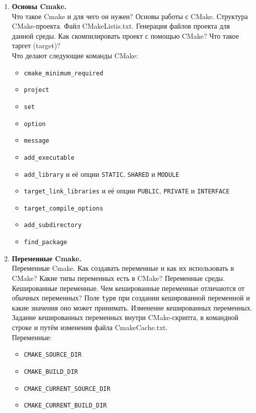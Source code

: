 \documentclass{article}
\begin{document}
\begin{enumerate}
\newpage

\item \textbf{Основы Cmake.}\\
Что такое Cmake и для чего он нужен? Основы работы с CMake. Структура CMake-проекта. Файл CMakeListis.txt. Генерация файлов проекта для данной среды. 
Как скомпилировать проект с помощью CMake? Что такое таргет (target)?\\
Что делают следующие команды CMake:
\begin{itemize}
\item \texttt{cmake\_minimum\_required}
\item \texttt{project}
\item \texttt{set}
\item \texttt{option}
\item \texttt{message}
\item \texttt{add\_executable}
\item \texttt{add\_library} и её опции \texttt{STATIC}, \texttt{SHARED} и \texttt{MODULE}
\item \texttt{target\_link\_libraries} и её опции \texttt{PUBLIC}, \texttt{PRIVATE} и \texttt{INTERFACE}
\item \texttt{target\_compile\_options}
\item \texttt{add\_subdirectory}
\item \texttt{find\_package}
\end{itemize}


\item \textbf{Переменные Cmake.}\\
Переменные Cmake. Как создавать переменные и как их использовать в CMake? Какие типы переменных есть в CMake?
Переменные среды. Кешированные переменные. Чем кешированные переменные отличаются от обычных переменных? Поле \texttt{type} при создании кешированной переменной и какие значения оно может принимать. Изменение кешированных переменных. Задание кешированных переменных внутри CMake-скрипта, в командной строке и путём изменения файла CmakeCache.txt.\\
Переменные:
\begin{itemize}
\item \texttt{CMAKE\_SOURCE\_DIR}
\item \texttt{CMAKE\_BUILD\_DIR}
\item \texttt{CMAKE\_CURRENT\_SOURCE\_DIR}
\item \texttt{CMAKE\_CURRENT\_BUILD\_DIR}
\end{itemize}




\end{enumerate}
\end{document}
